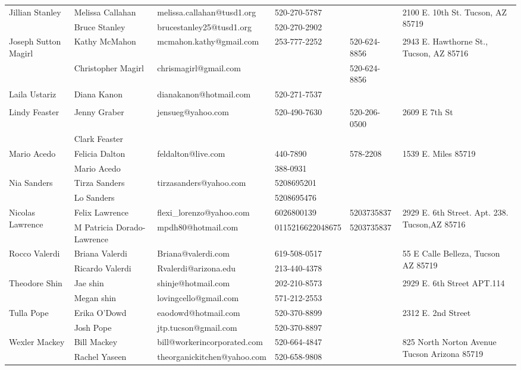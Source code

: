 \documentclass[landscape]{article}\usepackage[]{graphicx}\usepackage[]{color}
\begin{document}
\begin{longtable}{|p{100pt}|p{100pt}|p{140pt}|p{60pt}|p{64pt}|p{120pt}|}
\hline
\multirow{2}{100pt}{Jillian Stanley} & Melissa Callahan & melissa.callahan@tusd1.org & 520-270-5787 &  & \multirow{2}{120pt}{2100 E. 10th St. Tucson, AZ 85719} \\
 & Bruce Stanley & brucestanley25@tusd1.org & 520-270-2902 &  & \\
\hline
\multirow{2}{100pt}{Joseph Sutton Magirl} & Kathy McMahon & mcmahon.kathy@gmail.com & 253-777-2252 & 520-624-8856 & \multirow{2}{120pt}{2943 E. Hawthorne St., Tucson, AZ 85716} \\
 & Christopher Magirl & chrismagirl@gmail.com &  & 520-624-8856 & \\
\hline
\multirow{2}{100pt}{Laila Ustariz} & Diana Kanon & dianakanon@hotmail.com & 520-271-7537 &  & \multirow{2}{120pt}{} \\
 &  &  &  &  & \\
\hline
\multirow{2}{100pt}{Lindy Feaster} & Jenny Graber & jensueg@yahoo.com & 520-490-7630 & 520-206-0500 & \multirow{2}{120pt}{2609 E 7th St} \\
 & Clark Feaster &  &  &  & \\
\hline
\multirow{2}{100pt}{Mario Acedo} & Felicia Dalton & feldalton@live.com & 440-7890 & 578-2208 & \multirow{2}{120pt}{1539 E. Miles 85719} \\
 & Mario Acedo &  & 388-0931 &  & \\
\hline
\multirow{2}{100pt}{Nia Sanders} & Tirza Sanders & tirzasanders@yahoo.com & 5208695201 &  & \multirow{2}{120pt}{} \\
 & Lo Sanders &  & 5208695476 &  & \\
\hline
\multirow{2}{100pt}{Nicolas Lawrence} & Felix Lawrence & flexi\_lorenzo@yahoo.com & 6026800139 & 5203735837 & \multirow{2}{120pt}{2929 E. 6th Street. Apt. 238. Tucson,AZ 85716} \\
 & M Patricia Dorado-Lawrence & mpdh80@hotmail.com & 0115216622048675 & 5203735837 & \\
\hline
\multirow{2}{100pt}{Rocco Valerdi} & Briana Valerdi & Briana@valerdi.com & 619-508-0517 &  & \multirow{2}{120pt}{55 E Calle Belleza, Tucson AZ 85719} \\
 & Ricardo Valerdi & Rvalerdi@arizona.edu & 213-440-4378 &  & \\
\hline
\multirow{2}{100pt}{Theodore Shin} & Jae shin & shinje@hotmail.com & 202-210-8573 &  & \multirow{2}{120pt}{2929 E. 6th Street APT.114} \\
 & Megan shin & lovingcello@gmail.com & 571-212-2553 &  & \\
\hline
\multirow{2}{100pt}{Tulla Pope} & Erika O'Dowd & eaodowd@hotmail.com & 520-370-8899 &  & \multirow{2}{120pt}{2312 E. 2nd Street} \\
 & Josh Pope & jtp.tucson@gmail.com & 520-370-8897 &  & \\
\hline
\multirow{2}{100pt}{Wexler Mackey} & Bill Mackey & bill@workerincorporated.com & 520-664-4847 &  & \multirow{2}{120pt}{825 North Norton Avenue Tucson Arizona 85719} \\
 & Rachel Yaseen & theorganickitchen@yahoo.com & 520-658-9808 &  & \\
\hline
\end{longtable}
\newpage
\end{document}
